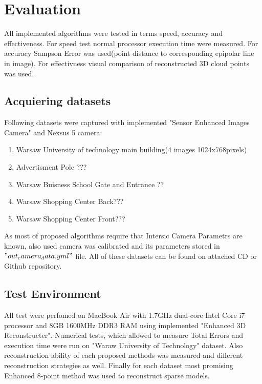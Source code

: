 
\ifpdf
    \graphicspath{{figures/}{figures/comparisons}}
\else
    \graphicspath{{figures/}{figures/comparisons}}
\fi


\chapter{Evaluation} %
All implemented algorithms were tested in terms speed, accuracy and effectiveness. For speed test normal processor execution time were measured. For accuracy Sampson Error was used(point distance to corresponding epipolar line in image). For effectivness visual comparison of reconstructed 3D cloud points was used.
\section{Acquiering datasets}
Following datasets were captured with implemented "Sensor Enhanced Images Camera" and Nexsus 5 camera:
\begin{enumerate}
\item Warsaw University of technology main building(4 images 1024x768pixels)
\item Advertisment Pole ??? 
\item Warsaw Buisness School Gate and Entrance ??
\item Warsaw Shopping Center Back???
\item Warsaw Shopping Center Front???
\end{enumerate}
As most of proposed algorithms require that Intersic Camera Parametrs are known, also used camera was calibrated and its parameters stored in $"out_camera_data.yml"$ file. All of these datasets can be found on attached CD or Github repository.
\section{Test Environment}
All test were perfomed on MacBook Air with 1.7GHz dual-core Intel Core i7 processor and 8GB 1600MHz DDR3 RAM using implemented "Enhanced 3D Reconstructer".  Numerical tests, which allowed to measure Total Errors and execution time were run on "Waraw University of Technology" dataset. Also  reconstruction ability of each proposed methods was measured and different reconstruction strategies as well.  Finally for each dataset most promising Enhanced 8-point method was used to reconstruct sparse models. 

